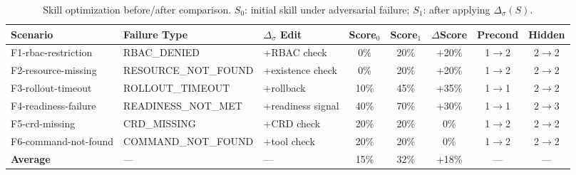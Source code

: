 \begin{table}[t]
\centering
\caption{Skill optimization before/after comparison. $S_0$: initial skill under adversarial failure; $S_1$: after applying $\Delta_\sigma(S)$.}
\label{tab:optimization}
\small
\begin{tabular}{lllccccc}
\toprule
\textbf{Scenario} & \textbf{Failure Type} & \textbf{$\Delta_\sigma$ Edit} & \textbf{Score$_0$} & \textbf{Score$_1$} & \textbf{$\Delta$Score} & \textbf{Precond} & \textbf{Hidden} \\
\midrule
  F1-rbac-restriction & RBAC\_DENIED & +RBAC check & 0\% & 20\% & +20\% & 1$\to$2 & 2$\to$2 \\
  F2-resource-missing & RESOURCE\_NOT\_FOUND & +existence check & 0\% & 20\% & +20\% & 1$\to$2 & 2$\to$2 \\
  F3-rollout-timeout & ROLLOUT\_TIMEOUT & +rollback & 10\% & 45\% & +35\% & 1$\to$1 & 2$\to$2 \\
  F4-readiness-failure & READINESS\_NOT\_MET & +readiness signal & 40\% & 70\% & +30\% & 1$\to$1 & 2$\to$3 \\
  F5-crd-missing & CRD\_MISSING & +CRD check & 20\% & 20\% & 0\% & 1$\to$2 & 2$\to$2 \\
  F6-command-not-found & COMMAND\_NOT\_FOUND & +tool check & 20\% & 20\% & 0\% & 1$\to$2 & 2$\to$2 \\
\midrule
  \textbf{Average} & — & — & 15\% & 32\% & +18\% & — & — \\
\bottomrule
\end{tabular}
\end{table}